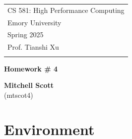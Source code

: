 \documentclass[a4paper,12pt]{article}
\theoremstyle{definition}
\theoremstyle{remark}
\begin{document}
	
	
	
	
	
	\thispagestyle{empty} %
	
	\begin{tabular}{p{15.5cm}} %
		{\large \sc CS 581:  High Performance Computing} \\
		Emory University \\ Spring 2025 \\ Prof. Tianshi Xu \\
		\hline %
		\\
	\end{tabular} %
	
	\vspace*{0.3cm} %
	
	\begin{center} %
		{\Large \bf Homework \# 4} %
		\vspace{2mm}
		
		{\bf Mitchell Scott}\\ (mtscot4) %
		
	\end{center}  
	
	\vspace{0.4cm}
	
	
	
	\section{Environment}
	
\end{document}
